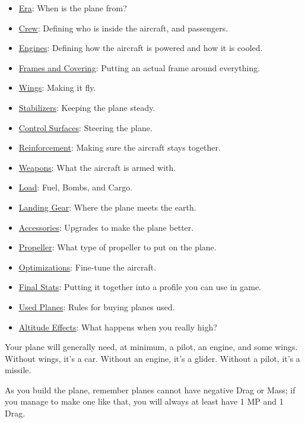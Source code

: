 \documentclass{article}
\begin{document}
\begin{itemize}
    \item  \hyperref[_Era]{Era}: When is the plane from?
    \item  \hyperref[_Crew]{Crew}: Defining who is inside the aircraft, and passengers.
    \item  \hyperref[_Engines]{Engines}: Defining how the aircraft is powered and how it is cooled.
    \item  \hyperref[_Frame_and_Covering]{Frames and Covering}: Putting an actual frame around everything.
    \item  \hyperref[_Wings]{Wings}: Making it fly.
    \item  \hyperref[_Stabilizers]{Stabilizers}: Keeping the plane steady.
    \item  \hyperref[_Control_Surfaces]{Control Surfaces}: Steering the plane.
    \item  \hyperref[_Reinforcement]{Reinforcement}: Making sure the aircraft stays together.
    \item  \hyperref[_Weapons]{Weapons}: What the aircraft is armed with.
    \item  \hyperref[_Load]{Load}: Fuel, Bombs, and Cargo.
    \item  \hyperref[_Landing_Gear]{Landing Gear}: Where the plane meets the earth.
    \item  \hyperref[_Upgrades]{Accessories}: Upgrades to make the plane better.
    \item  \hyperref[_Propeller]{Propeller}: What type of propeller to put on the plane.
    \item  \hyperref[_Optimization]{Optimizations}: Fine-tune the aircraft.
    \item  \hyperref[_Final_Calculations]{Final Stats}: Putting it together into a profile you can use in game.
    \item  \hyperref[_Used_Planes]{Used Planes}: Rules for buying planes used.
    \item  \hyperref[_Altitude_Rules]{Altitude Effects}: What happens when you really high?
\end{itemize}

Your plane will generally need, at minimum, a pilot, an engine, and some
wings. Without wings, it's a car. Without an engine, it's a glider.
Without a pilot, it's a missile.

As you build the plane, remember planes cannot have negative Drag or
Mass; if you manage to make one like that, you will always at least have
1 MP and 1 Drag.
\end{document}
